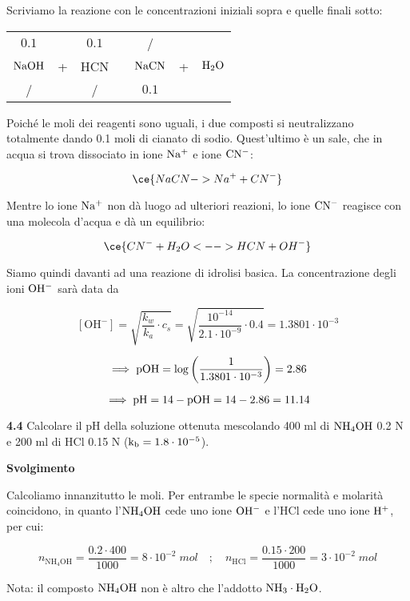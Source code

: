 Scriviamo la reazione con le concentrazioni iniziali sopra e quelle finali sotto:

\begin{center}
    \begin{tabular}{ccccccc}
        $0.1$ &  & $0.1$ & & / &&\\
        $\rm NaOH$ & + & HCN & \ce{->} & $\rm NaCN$ & + & $\rm H_2O$\\
        / &  &  / & & $0.1$ &&\\
    \end{tabular}
\end{center}

Poiché le moli dei reagenti sono uguali, i due composti si neutralizzano totalmente dando 0.1 moli di cianato di sodio. Quest'ultimo è un sale, che in acqua si trova dissociato in ione $\rm Na^+$ e ione $\rm CN^-$:

$$\ce{NaCN -> Na^+ + CN^-}$$

Mentre lo ione $\rm Na^+$ non dà luogo ad ulteriori reazioni, lo ione $\rm CN^-$ reagisce con una molecola d'acqua e dà un equilibrio:

$$\ce{CN^- + H_2O <--> HCN + OH^-}$$

Siamo quindi davanti ad una reazione di idrolisi basica. La concentrazione degli ioni $\rm OH^-$ sarà data da

$$[\text{OH}^-]
=\sqrt{\frac{k_w}{k_a}\cdot c_s}
=\sqrt{\frac{10^{-14}}{2.1 \cdot 10^{-9}} \cdot 0.4}
=1.3801 \cdot 10^{-3}$$

$$\implies \rm pOH
=\log{\left(\frac{1}{1.3801 \cdot 10^{-3}}\right)}
=2.86$$

$$\implies \rm pH=14-pOH=14-2.86=11.14$$

\textbf{4.4} Calcolare il pH della soluzione ottenuta mescolando 400 ml di $\rm NH_4OH$ 0.2 N e 200 ml di HCl 0.15 N ($\rm k_b = 1.8 \cdot 10^{-5}$).

\vspace{0.2cm}\large\textbf{Svolgimento}\normalsize

\vspace{0.2cm}Calcoliamo innanzitutto le moli. Per entrambe le specie normalità e molarità coincidono, in quanto l'$\rm NH_4OH$ cede uno ione $\rm OH^-$ e l'HCl cede uno ione $\rm H^+$, per cui:

$$n_{\text{NH}_4\text{OH}}=\frac{0.2 \cdot 400}{1000}=8 \cdot 10^{-2} \; mol
\quad ; \quad
n_{\text{HCl}}=\frac{0.15 \cdot 200}{1000}=3 \cdot 10^{-2} \; mol$$

Nota: il composto $\rm NH_4OH$ non è altro che l'addotto $\rm NH_3 \cdot H_2O$.

